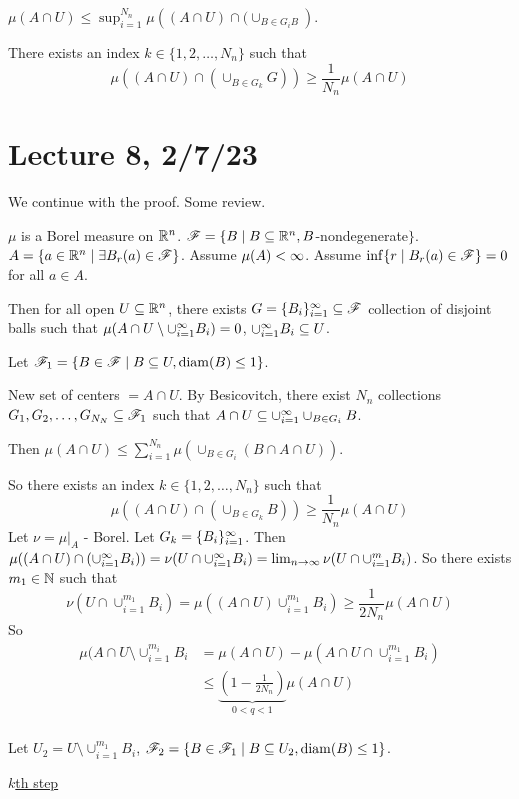 \documentclass[x11names,reqno,14pt]{extarticle}
\newcommand{\seq}[2][\oo]{_{#2 = 1}^#1}
\newcommand{\cupi}[1][\oo]{\cup\seq[#1]{i}}
\DeclareMathOperator{\diam}{diam}
\begin{document}
$\mu(A \cap U) \leq \sup_{i=1}^{N_n}\mu\left((A \cap U) \cap (\cup_{B\in G_iB}\right)$. 

There exists an index $k \in \{1, 2, \dots, N_n\}$ such that
\[
\mu\left((A \cap U) \cap (\cup_{B\in G_k}G)\right) \geq \frac{1}{N_n}\mu(A \cap U)
\]

\section*{Lecture 8, 2/7/23}

We continue with the proof. Some review. 

$\mu$ is a Borel measure on $\mathbb{R}^n$. $\mathscr{F} = \{B\mid B \subseteq \mathbb{R}^n, B$-nondegenerate$\}$. $A = \{a\in\mathbb{R}^n\mid \exists B_r(a)\in\mathscr{F}\}$. Assume $\mu(A)<\infty$. Assume $\inf\{r\mid B_r(a)\in\mathscr{F}\} =0$ for all $a\in A$.

Then for all open $U\subseteq\mathbb{R}^n$, there exists $G = \{B_i\}\seq{i}\subseteq\ms{F}$ collection of disjoint balls such that $\mu(A \cap U \setminus \cupi B_i) = 0$, $\cupi B_i \subseteq U$.  

Let $\ms{F}_1 = \{B\in\ms{F}\mid B\subseteq U, \diam(B)\leq1\}$. 

New set of centers $= A \cap U$. By Besicovitch, there exist $N_n$ collections $G_1, G_2, \dots, G_{N_N}\subseteq\mathscr{F}_1$ such that $A \cap U \subseteq\cupi\cup_{B\in G_i}B$. 

Then $\mu(A \cap U) \leq \sum_{i=1}^{N_n}\mu(\cup_{B\in G_i}(B\cap A\cap U))$.

So there exists an index $k\in\{1, 2, \dots, N_n\}$ such that
\[
\mu((A\cap U) \cap (\cup_{B\in G_k}B))\geq\frac{1}{N_n}\mu(A \cap U)
\]
Let $\nu = \mu|_A$ - Borel.
Let $G_k = \{B_i\}\seq{i}$. Then $\mu((A \cap U) \cap (\cupi B_i)) = \nu(U \cap \cupi B_i) = \lim_{n\to\oo}\nu(U \cap \cupi[m]B_i)$. So there exists $m_1 \in \mathbb{N}$ such that 
\[
\nu(U\cap \cup_{i=1}^{m_1}B_i) = \mu((A\cap U)\cup_{i=1}^{m_1}B_i) \geq \frac{1}{2N_n}\mu(A \cap U)
\]
So 
\begin{align*}
\mu(A \cap U \setminus \cup_{i=1}^{m_i}B_i & = \mu(A \cap U) - \mu(A \cap U \cap \cup_{i=1}^{m_1}B_i) \\
& \leq \underbrace{(1 - \frac{1}{2N_n})}_{0<q<1}\mu(A \cap U) \\
\end{align*}

Let $U_2 = U \setminus \cup_{i=1}^{m_1}B_i$, $\ms{F}_2 = \{B\in\ms{F}_1 \mid B \subseteq U_2, \diam(B)\leq1\}$. 

\underline{$k$th step}
\end{document}
